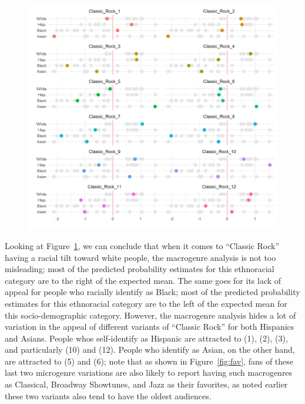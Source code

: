 \documentclass[a4paper,12pt]{extarticle}
\begin{document}
\begin{figure}[ht!]
    \centering
    \includegraphics[width=1.0\textwidth]{Figs/Link Clust/classic-rock-race.png}
    \caption{}
    \label{fig:race}
\end{figure}

Looking at Figure~\ref{fig:race}, we can conclude that when it comes to ``Classic Rock'' having a racial tilt toward white people, the macrogenre analysis is not too misleading; most of the predicted probability estimates for this ethnoracial category are to the right of the expected mean. The same goes for its lack of appeal for people who racially identify as Black; most of the predicted probability estimates for this ethnoracial category are to the left of the expected mean for this socio-demographic category. However, the macrogenre analysis hides a lot of variation in the appeal of different variants of ``Classic Rock'' for both Hispanics and Asians. People whos self-identify as Hispanic are attracted to (1), (2), (3), and particularly (10) and (12). People who identify as Asian, on the other hand, are attracted to (5) and (6); note that as shown in Figure~\ref{fig:fav}, fans of these last two microgenre variations are also likely to report having such macrogenres as Classical, Broadway Showtunes, and Jazz as their favorites, as noted earlier these two variants also tend to have the oldest audiences. 
\end{document}
